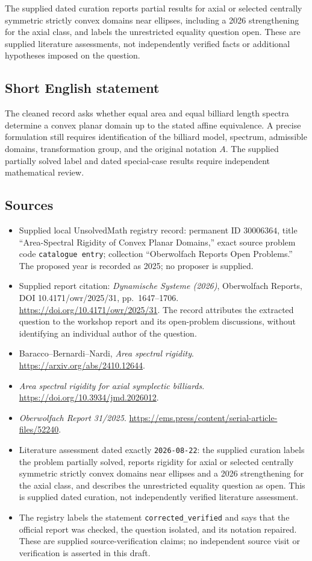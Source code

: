 \documentclass[11pt]{article}
\begin{document}
The supplied dated curation reports partial results for axial or selected centrally symmetric strictly convex domains near ellipses, including a 2026 strengthening for the axial class, and labels the unrestricted equality question open. These are supplied literature assessments, not independently verified facts or additional hypotheses imposed on the question.
\subsection{Short English statement}
The cleaned record asks whether equal area and equal billiard length spectra determine a convex planar domain up to the stated affine equivalence. A precise formulation still requires identification of the billiard model, spectrum, admissible domains, transformation group, and the original notation \(A\). The supplied partially solved label and dated special-case results require independent mathematical review.
\subsection{Sources}
\begin{itemize}
\item Supplied local UnsolvedMath registry record: permanent ID \(30006364\), title ``Area-Spectral Rigidity of Convex Planar Domains,'' exact source problem code \texttt{catalogue entry}; collection ``Oberwolfach Reports Open Problems.'' The proposed year is recorded as 2025; no proposer is supplied.
\item Supplied report citation: \emph{Dynamische Systeme (2026)}, Oberwolfach Reports, DOI 10.4171/owr/2025/31, pp.~1647--1706. \url{https://doi.org/10.4171/owr/2025/31}. The record attributes the extracted question to the workshop report and its open-problem discussions, without identifying an individual author of the question.
\item Baracco--Bernardi--Nardi, \emph{Area spectral rigidity}. \url{https://arxiv.org/abs/2410.12644}.
\item \emph{Area spectral rigidity for axial symplectic billiards}. \url{https://doi.org/10.3934/jmd.2026012}.
\item \emph{Oberwolfach Report 31/2025}. \url{https://ems.press/content/serial-article-files/52240}.
\item Literature assessment dated exactly \texttt{2026-08-22}: the supplied curation labels the problem partially solved, reports rigidity for axial or selected centrally symmetric strictly convex domains near ellipses and a 2026 strengthening for the axial class, and describes the unrestricted equality question as open. This is supplied dated curation, not independently verified literature assessment.
\item The registry labels the statement \texttt{corrected\_verified} and says that the official report was checked, the question isolated, and its notation repaired. These are supplied source-verification claims; no independent source visit or verification is asserted in this draft.
\end{itemize}
\end{document}
